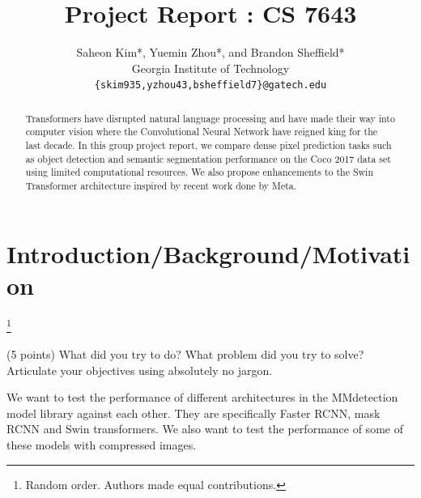 \documentclass[10pt,twocolumn,letterpaper]{article}
\begin{document}
\title{Project Report : CS 7643}

\author{Saheon Kim*, Yuemin Zhou*, and Brandon Sheffield*\\
Georgia Institute of Technology\\
{\tt\small \{skim935,yzhou43,bsheffield7\}@gatech.edu}
}

\maketitle

\begin{abstract}

   Transformers have disrupted natural language processing and have made their way into computer vision where the Convolutional Neural Network have reigned king for the last decade. In this group project report, we compare dense pixel prediction tasks such as object detection and semantic segmentation performance on the Coco 2017 data set using limited computational resources. We also propose enhancements to the Swin Transformer architecture inspired by recent work done by Meta.
\end{abstract}

\section{Introduction/Background/Motivation}

\footnote{Random order. Authors made equal contributions.}

(5 points) What did you try to do? What problem did you try to solve? Articulate your objectives using absolutely no jargon.

We want to test the performance of different architectures in the MMdetection model library against each other. They are specifically Faster RCNN, mask RCNN and Swin transformers. We also want to test the performance of some of these models with compressed images. 
\end{document}
